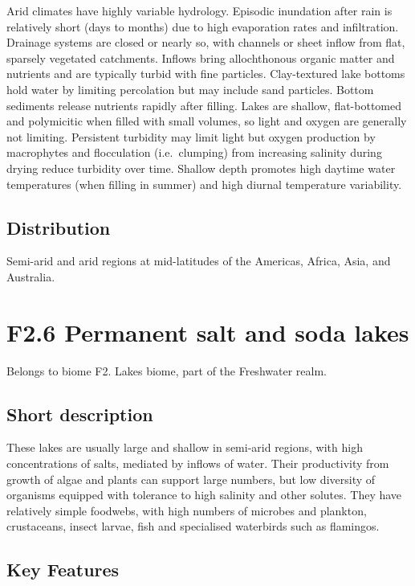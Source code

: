 \documentclass[
  letterpaper,
  DIV=11,
  numbers=noendperiod]{scrartcl}
\begin{document}
Arid climates have highly variable hydrology. Episodic inundation after
rain is relatively short (days to months) due to high evaporation rates
and infiltration. Drainage systems are closed or nearly so, with
channels or sheet inflow from flat, sparsely vegetated catchments.
Inflows bring allochthonous organic matter and nutrients and are
typically turbid with fine particles. Clay-textured lake bottoms hold
water by limiting percolation but may include sand particles. Bottom
sediments release nutrients rapidly after filling. Lakes are shallow,
flat-bottomed and polymicitic when filled with small volumes, so light
and oxygen are generally not limiting. Persistent turbidity may limit
light but oxygen production by macrophytes and flocculation
(i.e.~clumping) from increasing salinity during drying reduce turbidity
over time. Shallow depth promotes high daytime water temperatures (when
filling in summer) and high diurnal temperature variability.

\subsection{Distribution}\label{distribution-121}

Semi-arid and arid regions at mid-latitudes of the Americas, Africa,
Asia, and Australia.

\section{F2.6 Permanent salt and soda
lakes}\label{f2.6-permanent-salt-and-soda-lakes-1}

Belongs to biome F2. Lakes biome, part of the Freshwater realm.

\subsection{Short description}\label{short-description-122}

These lakes are usually large and shallow in semi-arid regions, with
high concentrations of salts, mediated by inflows of water. Their
productivity from growth of algae and plants can support large numbers,
but low diversity of organisms equipped with tolerance to high salinity
and other solutes. They have relatively simple foodwebs, with high
numbers of microbes and plankton, crustaceans, insect larvae, fish and
specialised waterbirds such as flamingos.

\subsection{Key Features}\label{key-features-122}
\end{document}
